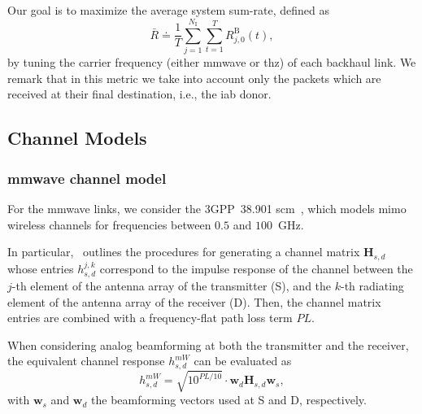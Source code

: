 Our goal is to maximize the average system sum-rate, defined as
\begin{equation}
 \bar{R} \doteq \frac{1}{T} \sum_{j = 1}^{N_{\mathrm{I}}} \sum_{t = 1}^{T} R_{j, 0}^{\mathrm{B}} (t),
\end{equation}
%
by tuning the carrier frequency (either \gls{mmwave} or \gls{thz}) of each backhaul link. We remark that in this metric we take into account only the packets which are received at their final destination, i.e., the \gls{iab} donor.

\subsection{Channel Models}
\label{sub:channelmodel}
\subsubsection*{\gls{mmwave} channel model}

For the \gls{mmwave} links, we consider the 3GPP~38.901 \gls{scm}~\cite{3gpp.38.901}, which models \gls{mimo} wireless channels for frequencies between $0.5$ and $100$~GHz. %

In particular,~\cite{3gpp.38.901} outlines the procedures for generating a channel matrix $\bm{H}_{s, d}$ whose entries $h_{s, d}^{j, k}$ correspond to the impulse response of the channel between the $j$-th element of the antenna array of the transmitter (S), and the $k$-th radiating element of the antenna array of the receiver (D). %
Then, the channel matrix entries are combined with a frequency-flat path loss term $PL$. 

When considering analog beamforming at both the transmitter and the receiver, the equivalent channel response $h_{s, d}^{mW}$ can be evaluated as
\begin{equation}
\label{eq:sinr}
    h_{s, d}^{mW} = \sqrt{10^{PL/10}} \cdot \bm{w}_{d} \bm{H}_{s, d} \bm{w}_{s},
\end{equation}
%
with $\bm{w}_{s}$ and $\bm{w}_{d}$ the beamforming vectors used at S and D, respectively.

